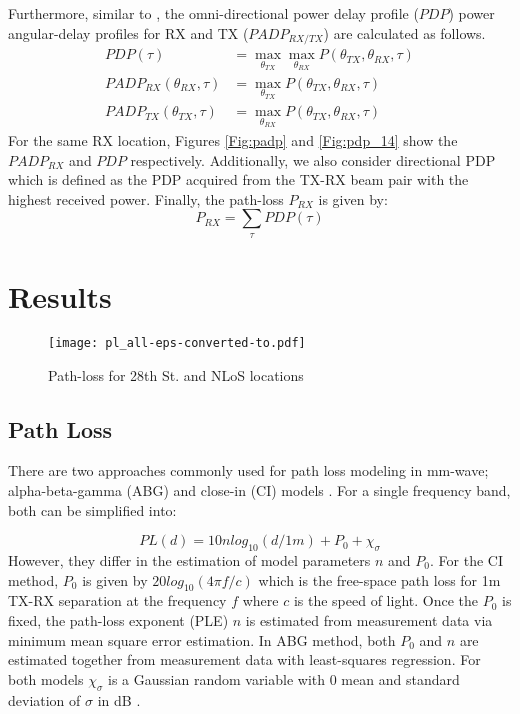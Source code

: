 \documentclass[conference]{IEEEtran}
\begin{document}
Furthermore, similar to \cite{hur_synchronous_2014}, the omni-directional power delay profile ($PDP$) power angular-delay profiles for RX and TX ($PADP_{RX/TX}$) are calculated as follows. 
\begin{align} 
  PDP (\tau) &= {\displaystyle \max_{\theta_{TX}} \max_{\theta_{RX}}  P(\theta_{TX},\theta_{RX},\tau)} \label{eq:pdp}\\ 
  PADP_{RX}(\theta_{RX},\tau) &= {\displaystyle \max_{\theta_{TX}} P(\theta_{TX},\theta_{RX},\tau)} \\
  PADP_{TX}(\theta_{TX},\tau) &= {\displaystyle \max_{\theta_{RX}} P(\theta_{TX},\theta_{RX},\tau)}
 \end{align} 
For the same RX location, Figures \ref{Fig:padp} and \ref{Fig:pdp_14} show the $PADP_{RX}$ and $PDP$ respectively. Additionally, we also consider directional PDP which is defined as the PDP acquired from the TX-RX beam pair with the highest received power. Finally, the path-loss $P_{RX}$ is given by:
\begin{equation}
 {\displaystyle  P_{RX} =  \sum_{\tau} PDP(\tau)} \label{eq:pl}
\end{equation}



\section{Results} \label{sec:results}


\begin{figure}[tbp]\centering
  \texttt{[image: pl\_all-eps-converted-to.pdf]}\caption{Path-loss for 28th St. and NLoS locations}\label{Fig:pl}
\end{figure}

\subsection{Path Loss}
There are two approaches commonly used for path loss modeling in mm-wave; alpha-beta-gamma (ABG) and close-in (CI) models \cite{Rappaport_2015_Wideband} \cite{Molisch_2016_eucap}. For a single frequency band, both can be simplified into:

\begin{equation} 
  PL(d)= 10nlog_{10}\left(d/1m \right) + P_0 + \chi_\sigma
\end{equation}
However, they differ in the estimation of model parameters $n$ and $P_0$. For the CI method, $P_0$ is given by $20log_{10}(4\pi f/c)$ which is the free-space path loss for 1m TX-RX separation at the frequency $f$ where $c$ is the speed of light. Once the $P_0$ is fixed, the path-loss exponent (PLE) $n$ is estimated from measurement data via minimum mean square error estimation. In ABG method, both $P_0$ and $n$ are estimated together from measurement data with least-squares regression. For both models $\chi_\sigma$ is a Gaussian random variable with 0 mean and standard deviation of $\sigma$ in dB \cite{Rappaport_2015_Wideband}. 
\end{document}
